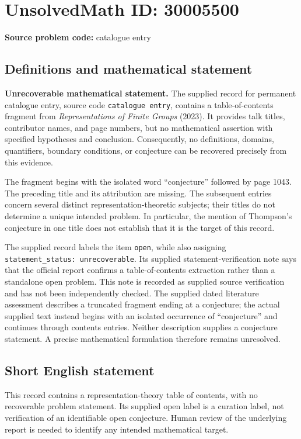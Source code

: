 \documentclass[11pt]{article}
\begin{document}
\section*{UnsolvedMath ID: 30005500}
\textbf{Source problem code:} catalogue entry
\subsection{Definitions and mathematical statement}
\textbf{Unrecoverable mathematical statement.} The supplied record for permanent catalogue entry, source code \texttt{catalogue entry}, contains a table-of-contents fragment from \emph{Representations of Finite Groups} (2023). It provides talk titles, contributor names, and page numbers, but no mathematical assertion with specified hypotheses and conclusion. Consequently, no definitions, domains, quantifiers, boundary conditions, or conjecture can be recovered precisely from this evidence.

The fragment begins with the isolated word ``conjecture'' followed by page 1043. The preceding title and its attribution are missing. The subsequent entries concern several distinct representation-theoretic subjects; their titles do not determine a unique intended problem. In particular, the mention of Thompson's conjecture in one title does not establish that it is the target of this record.

The supplied record labels the item \texttt{open}, while also assigning \texttt{statement\_status: unrecoverable}. Its supplied statement-verification note says that the official report confirms a table-of-contents extraction rather than a standalone open problem. This note is recorded as supplied source verification and has not been independently checked. The supplied dated literature assessment describes a truncated fragment ending at a conjecture; the actual supplied text instead begins with an isolated occurrence of ``conjecture'' and continues through contents entries. Neither description supplies a conjecture statement. A precise mathematical formulation therefore remains unresolved.
\subsection{Short English statement}
This record contains a representation-theory table of contents, with no recoverable problem statement. Its supplied open label is a curation label, not verification of an identifiable open conjecture. Human review of the underlying report is needed to identify any intended mathematical target.
\end{document}
